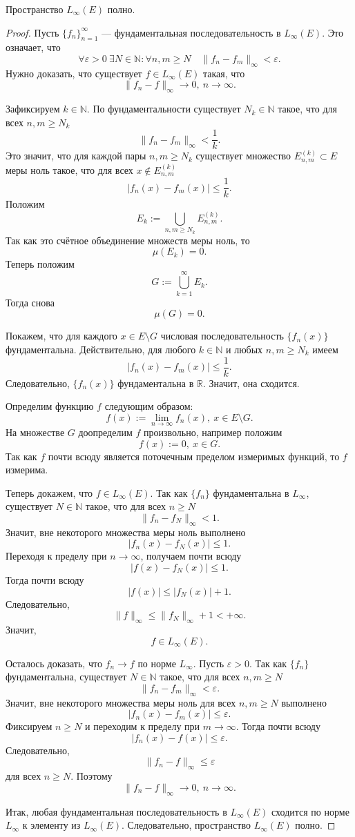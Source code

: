 \begin{theorem}
Пространство $L_\infty(E)$ полно.
\end{theorem}
\begin{proof}
    Пусть $\{f_n\}_{n=1}^\infty$ — фундаментальная последовательность в $L_\infty(E)$. Это означает, что
    \[
    \forall \varepsilon>0\ \exists N\in\mathbb N:
    \forall n,m\geqslant N
    \quad
    \|f_n-f_m\|_\infty<\varepsilon.
    \]
    Нужно доказать, что существует $f\in L_\infty(E)$ такая, что
    \[\|f_n-f\|_\infty\to 0,\ n\to\infty.\]

    Зафиксируем $k\in\mathbb N$. По фундаментальности существует $N_k\in\mathbb N$ такое, что для всех $n,m\geqslant N_k$
    \[\|f_n-f_m\|_\infty<\frac1k.\]
    Это значит, что для каждой пары $n,m\geqslant N_k$ существует множество $E_{n,m}^{(k)}\subset E$ меры ноль такое, что для всех $x\notin E_{n,m}^{(k)}$
    \[|f_n(x)-f_m(x)|\leqslant \frac1k.\]
    Положим
    \[E_k:=\bigcup_{n,m\geqslant N_k} E_{n,m}^{(k)}.\]
    Так как это счётное объединение множеств меры ноль, то
    \[\mu(E_k)=0.\]
    Теперь положим
    \[G:=\bigcup_{k=1}^{\infty}E_k.\]
    Тогда снова
    \[\mu(G)=0.\]

    Покажем, что для каждого $x\in E\setminus G$ числовая последовательность $\{f_n(x)\}$ фундаментальна. Действительно, для любого $k\in\mathbb N$ и любых $n,m\geqslant N_k$ имеем
    \[|f_n(x)-f_m(x)|\leqslant \frac1k.\]
    Следовательно, $\{f_n(x)\}$ фундаментальна в $\mathbb R$. Значит, она сходится.

    Определим функцию $f$ следующим образом:
    \[f(x):=\lim_{n\to\infty} f_n(x),\ x\in E\setminus G.\]
    На множестве $G$ доопределим $f$ произвольно, например положим
    \[f(x):=0,\ x\in G.\]
    Так как $f$ почти всюду является поточечным пределом измеримых функций, то $f$ измерима.

    Теперь докажем, что $f\in L_\infty(E)$. Так как $\{f_n\}$ фундаментальна в $L_\infty$, существует $N\in\mathbb N$ такое, что для всех $n\geqslant N$
    \[\|f_n-f_N\|_\infty<1.\]
    Значит, вне некоторого множества меры ноль выполнено
    \[|f_n(x)-f_N(x)|\leqslant 1.\]
    Переходя к пределу при $n\to\infty$, получаем почти всюду
    \[|f(x)-f_N(x)|\leqslant 1.\]
    Тогда почти всюду
    \[
    |f(x)|
    \leqslant
    |f_N(x)|+1.
    \]
    Следовательно,
    \[
    \|f\|_\infty
    \leqslant
    \|f_N\|_\infty+1
    <+\infty.
    \]
    Значит,
    \[f\in L_\infty(E).\]

    Осталось доказать, что $f_n\to f$ по норме $L_\infty$. Пусть $\varepsilon>0$. Так как $\{f_n\}$ фундаментальна, существует $N\in\mathbb N$ такое, что для всех $n,m\geqslant N$
    \[\|f_n-f_m\|_\infty<\varepsilon.\]
    Значит, вне некоторого множества меры ноль для всех $n,m\geqslant N$ выполнено
    \[|f_n(x)-f_m(x)|\leqslant \varepsilon.\]
    Фиксируем $n\geqslant N$ и переходим к пределу при $m\to\infty$. Тогда почти всюду
    \[|f_n(x)-f(x)|\leqslant \varepsilon.\]
    Следовательно,
    \[\|f_n-f\|_\infty\leqslant \varepsilon\]
    для всех $n\geqslant N$. Поэтому
    \[\|f_n-f\|_\infty\to 0,\ n\to\infty.\]

    Итак, любая фундаментальная последовательность в $L_\infty(E)$ сходится по норме $L_\infty$ к элементу из $L_\infty(E)$. Следовательно, пространство $L_\infty(E)$ полно.
\end{proof}